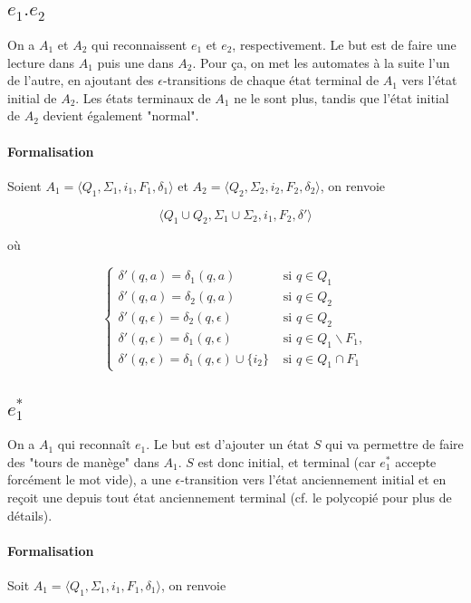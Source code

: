 \documentclass{article}[11pt]
\theoremstyle{definition}
\begin{document}
\subsection{$e_1.e_2$} On a $A_1$ et $A_2$ qui reconnaissent $e_1$ et $e_2$, respectivement. Le but est de faire une lecture dans $A_1$ puis une dans $A_2$. Pour ça, on met les automates à la suite l'un de l'autre, en ajoutant des $\epsilon$-transitions de chaque état terminal de $A_1$ vers l'état initial de $A_2$. Les états terminaux de $A_1$ ne le sont plus, tandis que l'état initial de $A_2$ devient également "normal".

\paragraph*{Formalisation} Soient $A_1 = \big \langle Q_1,\Sigma_1,i_1,F_1,\delta_1 \big \rangle$ et $A_2 = \big \langle Q_2,\Sigma_2,i_2,F_2,\delta_2 \big \rangle$, on renvoie 

\[
\big \langle Q_1 \cup Q_2 ,\Sigma_1 \cup \Sigma_2,i_1,F_2,\delta' \big \rangle
\]

où

\[
\begin{cases}
\delta'(q,a) = \delta_1(q,a) &\text{ si } q \in Q_1\\[1ex]
\delta'(q,a) = \delta_2(q,a) &\text{ si } q \in Q_2\\[1ex]
\delta'(q,\epsilon) = \delta_2(q,\epsilon) &\text{ si } q \in Q_2\\[1ex]
\delta'(q,\epsilon) = \delta_1(q,\epsilon) &\text{ si } q \in Q_1 \backslash F_1,\\[1ex]
\delta'(q,\epsilon) = \delta_1(q,\epsilon) \cup \{i_2\} &\text{ si } q \in Q_1 \cap F_1
 \end{cases}
\]



\subsection{$e_1^*$} On a $A_1$ qui reconnaît $e_1$. Le but est d'ajouter un état $S$ qui va permettre de faire des "tours de manège" dans $A_1$. $S$ est donc initial, et terminal (car $e_1^*$ accepte forcément le mot vide), a une $\epsilon$-transition vers l'état anciennement initial et en  reçoit une depuis tout état anciennement terminal (cf. le polycopié pour plus de détails).

\paragraph*{Formalisation} Soit $A_1 = \big \langle Q_1,\Sigma_1,i_1,F_1,\delta_1 \big \rangle$, on renvoie 
\end{document}
